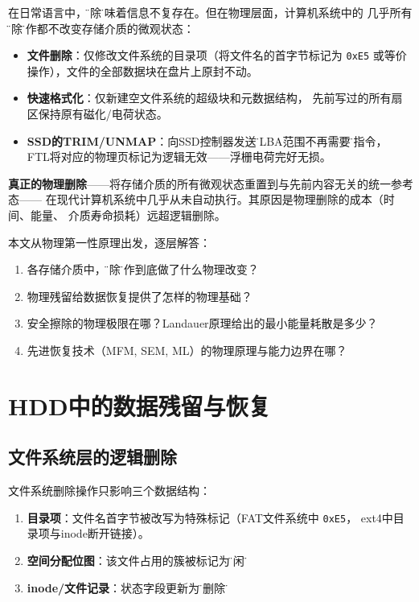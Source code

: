 \documentclass[11pt,a4paper,twoside]{article}
\theoremstyle{definition}\newtheorem{definition}{定义}[section]
\theoremstyle{plain}\newtheorem{theorem}{定理}[section]
\theoremstyle{remark}\newtheorem{remark}{注解}[section]
\begin{document}
在日常语言中，\"删除\"意味着信息不复存在。但在物理层面，计算机系统中的
几乎所有\"删除\"操作都不改变存储介质的微观状态：

\begin{itemize}
  \item \textbf{文件删除}：仅修改文件系统的目录项（将文件名的首字节标记为 \texttt{0xE5}
  或等价操作），文件的全部数据块在盘片上原封不动。
  \item \textbf{快速格式化}：仅新建空文件系统的超级块和元数据结构，
  先前写过的所有扇区保持原有磁化/电荷状态。
  \item \textbf{SSD的TRIM/UNMAP}：向SSD控制器发送\"此LBA范围不再需要\"的指令，
  FTL将对应的物理页标记为逻辑无效——浮栅电荷完好无损。
\end{itemize}

\textbf{真正的物理删除}——将存储介质的所有微观状态重置到与先前内容无关的统一参考态——
在现代计算机系统中几乎从未自动执行。其原因是物理删除的成本（时间、能量、
介质寿命损耗）远超逻辑删除。

本文从物理第一性原理出发，逐层解答：

\begin{enumerate}[nosep]
  \item 各存储介质中，\"删除\"操作到底做了什么物理改变？
  \item 物理残留给数据恢复提供了怎样的物理基础？
  \item 安全擦除的物理极限在哪？Landauer原理给出的最小能量耗散是多少？
  \item 先进恢复技术（MFM, SEM, ML）的物理原理与能力边界在哪？
\end{enumerate}

\section{HDD中的数据残留与恢复}
\label{sec:hdd}

\subsection{文件系统层的逻辑删除}

文件系统删除操作只影响三个数据结构：
\begin{enumerate}
  \item \textbf{目录项}：文件名首字节被改写为特殊标记（FAT文件系统中 \texttt{0xE5}，
  ext4中目录项与inode断开链接）。
  \item \textbf{空间分配位图}：该文件占用的簇被标记为\"空闲\"。
  \item \textbf{inode/文件记录}：状态字段更新为\"已删除\"。
\end{enumerate}
\end{document}
